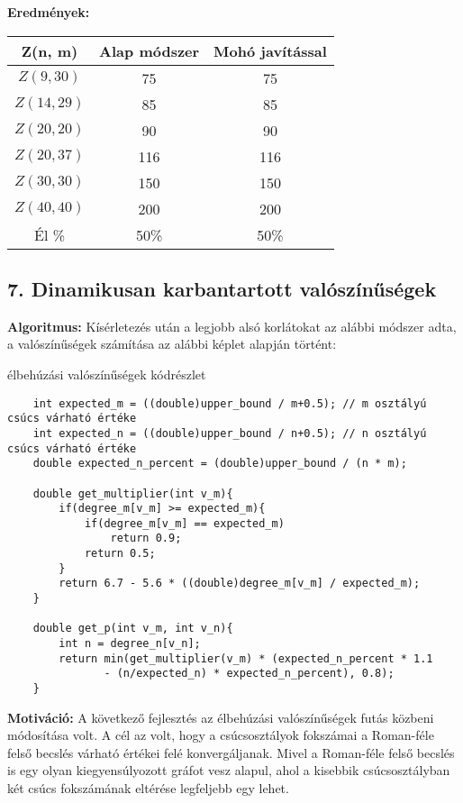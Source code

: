 \documentclass[12pt,a4paper]{article}
\begin{document}
\textbf{Eredmények:}
\begin{table}[H]
\centering
\begin{tabular}{|c|c|c|}
\hline
\textbf{Z(n, m)} & \textbf{Alap módszer} & \textbf{Mohó javítással} \\
\hline
$Z(9,30)$  & 75 & 75 \\
$Z(14, 29)$ & 85 & 85 \\
$Z(20, 20)$ & 90 & 90 \\
$Z(20, 37)$ & 116 & 116 \\
$Z(30, 30)$ & 150 & 150 \\
$Z(40, 40)$ & 200 & 200 \\
\hline
Él \% & 50\% & 50\% \\
\hline
\end{tabular}
\end{table}

\subsection*{7. Dinamikusan karbantartott valószínűségek}
\textbf{Algoritmus:} Kísérletezés után a legjobb alsó korlátokat az alábbi módszer adta, a valószínűségek számítása az alábbi
képlet alapján történt:
\begin{algorithm}[H]
\caption{élbehúzási valószínűségek kódrészlet}
\begin{verbatim} 
    int expected_m = ((double)upper_bound / m+0.5); // m osztályú csúcs várható értéke
    int expected_n = ((double)upper_bound / n+0.5); // n osztályú csúcs várható értéke
    double expected_n_percent = (double)upper_bound / (n * m);
    
    double get_multiplier(int v_m){
        if(degree_m[v_m] >= expected_m){
            if(degree_m[v_m] == expected_m)
                return 0.9;
            return 0.5;
        }
        return 6.7 - 5.6 * ((double)degree_m[v_m] / expected_m);
    }

    double get_p(int v_m, int v_n){
        int n = degree_n[v_n];
        return min(get_multiplier(v_m) * (expected_n_percent * 1.1
               - (n/expected_n) * expected_n_percent), 0.8);
    }
\end{verbatim}    
\end{algorithm}
\textbf{Motiváció:} A következő fejlesztés az élbehúzási valószínűségek futás közbeni módosítása volt. A cél az volt, hogy a csúcsosztályok fokszámai a Roman-féle felső becslés várható értékei felé konvergáljanak. Mivel a Roman-féle felső becslés is egy olyan kiegyensúlyozott gráfot vesz alapul, ahol a kisebbik csúcsosztályban két csúcs fokszámának eltérése legfeljebb egy lehet.
\end{document}
